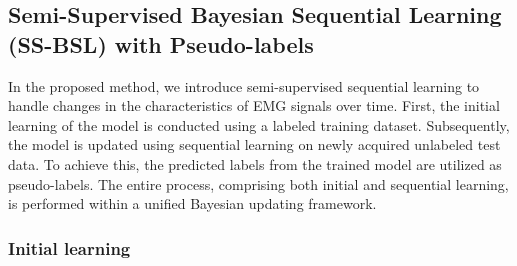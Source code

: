 \documentclass[letterpaper, 10 pt, conference]{ieeeconf}
\begin{document}
\subsection{Semi-Supervised Bayesian Sequential Learning (SS-BSL) with Pseudo-labels}
In the proposed method, we introduce semi-supervised sequential learning to handle changes in the characteristics of EMG signals over time.
First, the initial learning of the model is conducted using a labeled training dataset.
Subsequently, the model is updated using sequential learning on newly acquired unlabeled test data. 
To achieve this, the predicted labels from the trained model are utilized as pseudo-labels.
The entire process, comprising both initial and sequential learning, is performed within a unified Bayesian updating framework.

\subsubsection{Initial learning}
\end{document}

